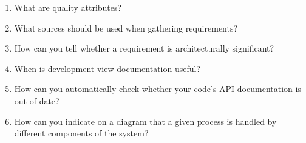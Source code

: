 \begin{enumerate}
\item
What are quality attributes?

\item
What sources should be used when gathering requirements?

\item
How can you tell whether a requirement is architecturally significant?

\item
When is development view documentation useful?

\item
How can you automatically check whether your code's API documentation is out of date?


\item
How can you indicate on a diagram that a given process is handled by different components of the system?

\end{enumerate}